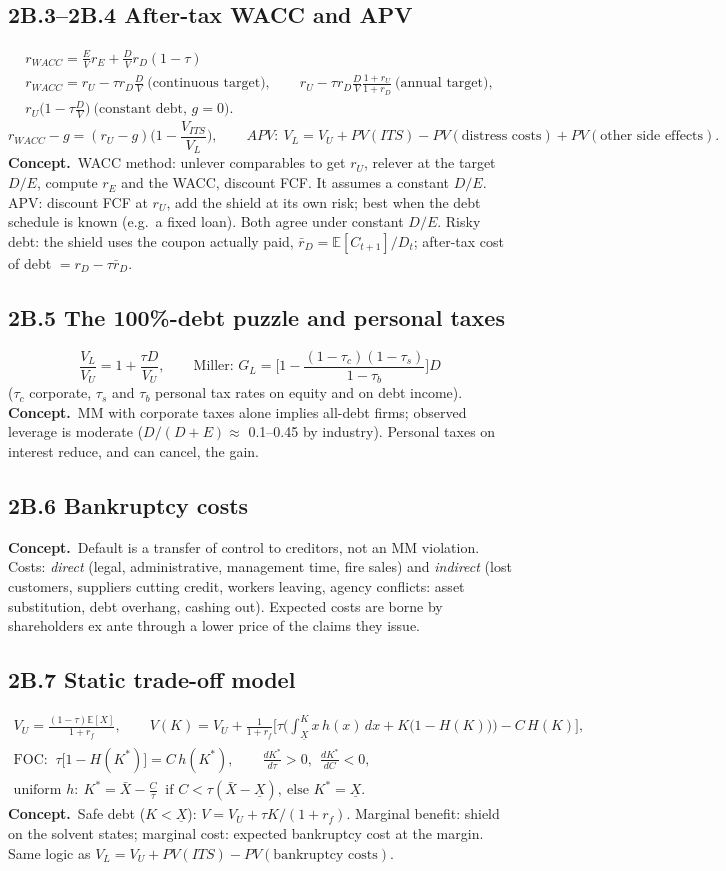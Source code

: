 \documentclass[10pt,a4paper]{article}
\newcommand{\blk}[1]{\subsection*{\color{blue!55!black}#1}}
\newcommand{\idea}{\textbf{Concept.}~}
\newcommand{\E}{\mathbb{E}}
\begin{document}
\blk{2B.3--2B.4 After-tax WACC and APV}
\begin{gather*}
\boxed{r_{WACC}=\frac EV r_E+\frac DV r_D(1-\tau)}\\
r_{WACC}=r_U-\tau r_D\frac DV\ \text{(continuous target)},\qquad
r_U-\tau r_D\frac DV\frac{1+r_U}{1+r_D}\ \text{(annual target)},\\
r_U\Big(1-\tau\frac DV\Big)\ \text{(constant debt, } g=0).
\end{gather*}
\[
r_{WACC}-g=(r_U-g)\Big(1-\frac{V_{ITS}}{V_L}\Big),\qquad
APV:\ V_L=V_U+PV(ITS)-PV(\text{distress costs})+PV(\text{other side effects}).
\]
\idea WACC method: unlever comparables to get $r_U$, relever at the target $D/E$, compute $r_E$ and the
WACC, discount FCF. It assumes a constant $D/E$. APV: discount FCF at $r_U$, add the shield at its
own risk; best when the debt schedule is known (e.g.\ a fixed loan). Both agree under constant $D/E$.
Risky debt: the shield uses the coupon actually paid, $\bar r_D=\E[C_{t+1}]/D_t$; after-tax cost of
debt $=r_D-\tau\bar r_D$.

\blk{2B.5 The 100\%-debt puzzle and personal taxes}
\[
\frac{V_L}{V_U}=1+\frac{\tau D}{V_U},\qquad
\text{Miller: } G_L=\Big[1-\frac{(1-\tau_c)(1-\tau_s)}{1-\tau_b}\Big]D
\]
($\tau_c$ corporate, $\tau_s$ and $\tau_b$ personal tax rates on equity and on debt income).
\idea MM with corporate taxes alone implies all-debt firms; observed leverage is moderate
($D/(D+E)\approx$ 0.1--0.45 by industry). Personal taxes on interest reduce, and can cancel, the gain.

\blk{2B.6 Bankruptcy costs}
\idea Default is a transfer of control to creditors, not an MM violation. Costs: \emph{direct}
(legal, administrative, management time, fire sales) and \emph{indirect} (lost customers, suppliers
cutting credit, workers leaving, agency conflicts: asset substitution, debt overhang, cashing out).
Expected costs are borne by shareholders ex ante through a lower price of the claims they issue.

\blk{2B.7 Static trade-off model}
\begin{gather*}
V_U=\frac{(1-\tau)\E[X]}{1+r_f},\qquad
V(K)=V_U+\frac{1}{1+r_f}\Big[\tau\Big(\int_{\underline X}^{K}x\,h(x)\,dx+K\big(1-H(K)\big)\Big)-C\,H(K)\Big],\\
\text{FOC: }\ \tau\big[1-H(K^*)\big]=C\,h(K^*),\qquad
\frac{dK^*}{d\tau}>0,\ \ \frac{dK^*}{dC}<0,\\
\text{uniform } h:\ K^*=\bar X-\frac{C}{\tau}\ \text{ if } C<\tau(\bar X-\underline X),\ \text{else } K^*=\underline X.
\end{gather*}
\idea Safe debt ($K<\underline X$): $V=V_U+\tau K/(1+r_f)$. Marginal benefit: shield on the solvent
states; marginal cost: expected bankruptcy cost at the margin. Same logic as
$V_L=V_U+PV(ITS)-PV(\text{bankruptcy costs})$.
\end{document}

